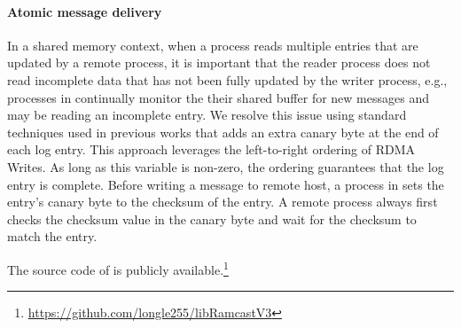 \paragraph{Atomic message delivery}
In a shared memory context, when a process reads multiple entries that are
updated by a remote process, it is important that the reader process does not
read incomplete data that has not been fully updated by the writer process,
e.g., processes in \libname continually monitor the their shared buffer for new
messages and may be reading an incomplete entry. We resolve this issue using
standard techniques used in previous works \cite{APUS,FaRM,kalia2014using,
islam2012high} that adds an extra canary byte at the end of each log entry. This
approach leverages the left-to-right ordering of RDMA Writes. As long as this
variable is non-zero, the ordering guarantees that the log entry is complete.
Before writing a message to remote host, a process in \libname sets the entry’s
canary byte to the checksum of the entry. A remote process always first checks
the checksum value in the canary byte and wait for the checksum to match the
entry.

The source code of \libname is publicly
available.\footnote{\url{https://github.com/longle255/libRamcastV3}}

%
%
